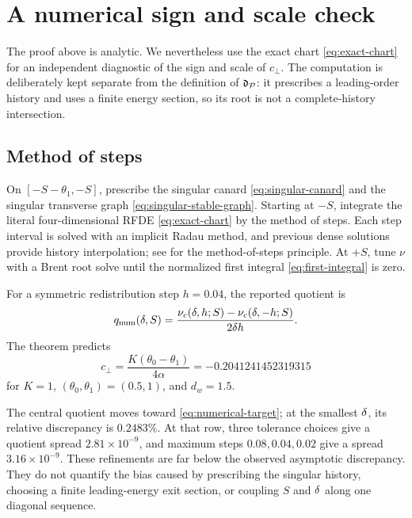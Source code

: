 \section{A numerical sign and scale check}
\label{sec:numerics}

The proof above is analytic.  We nevertheless use the exact chart
\cref{eq:exact-chart} for an independent diagnostic of the sign and scale of
\(c_\perp\).  The computation is deliberately kept separate from the
definition of \(\mathfrak d_\mathcal P\): it prescribes a leading-order history and
uses a finite energy section, so its root is not a complete-history
intersection.

\subsection{Method of steps}

On \([-S-\theta_1,-S]\), prescribe the singular canard
\cref{eq:singular-canard} and the singular transverse graph
\cref{eq:singular-stable-graph}.  Starting at \(-S\), integrate the literal
four-dimensional RFDE \cref{eq:exact-chart} by the method of steps.  Each
step interval is solved with an implicit Radau method, and previous dense
solutions provide history interpolation; see \citet{shampine2001solving}
for the method-of-steps principle.  At \(+S\), tune \(\nu\) with a Brent
root solve until the normalized first integral \cref{eq:first-integral} is
zero.

For a symmetric redistribution step \(h=0.04\), the reported quotient is
\begin{equation}
\label{eq:numerical-quotient}
 q_{\rm num}(\delta,S)
 =\frac{\nu_c(\delta,h;S)-\nu_c(\delta,-h;S)}{2\delta h}.
\end{equation}
The theorem predicts
\begin{equation}
\label{eq:numerical-target}
 c_\perp=\frac{K(\theta_0-\theta_1)}{4\alpha}
 =-0.2041241452319315
\end{equation}
for
\(K=1\), \((\theta_0,\theta_1)=(0.5,1)\), and
\(d_w=1.5\).

The central quotient moves toward \cref{eq:numerical-target}; at the
smallest \(\delta\), its relative discrepancy is \(0.2483\%\).  At that row,
three tolerance choices give a quotient spread
\(2.81\times10^{-9}\), and maximum steps
\(0.08,0.04,0.02\) give a spread \(3.16\times10^{-9}\).
These refinements are far below the observed asymptotic discrepancy.
They do not quantify the bias caused by prescribing the singular history,
choosing a finite leading-energy exit section, or coupling \(S\) and
\(\delta\) along one diagonal sequence.

